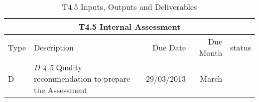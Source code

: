 \begin{table}[h]
\caption{T4.5 Inputs, Outputs and Deliverables} %
\begin{adjustbox}{width=\textwidth}
\begin{tabular}{|l|l|r|r|r|}
\hline
\multicolumn{5}{|c|}{\textbf{T4.5 Internal Assessment}} 
\\\hline
Type & Description & Due Date & Due Month & status 
\\\hline
 D &\emph{D 4.5} Quality recommendation to prepare the Assessment  & 29/03/2013 & March & 
\\\hline
\end{tabular}
\end{adjustbox}
\end{table}




